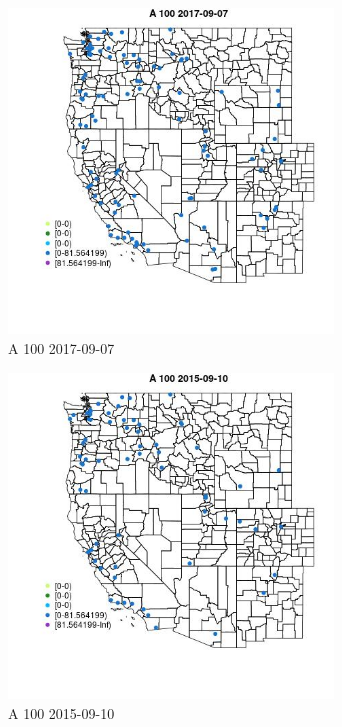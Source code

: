 \begin{figure} 
\centering  
\includegraphics[width=0.77\textwidth]{Code_Outputs/Report_ML_input_PM25_Step4_part_e_de_duplicated_aveswNAs_MapObsA_1002017-09-07.jpg} 
\caption{\label{fig:Report_ML_input_PM25_Step4_part_e_de_duplicated_aveswNAsMapObsA_1002017-09-07}A 100 2017-09-07} 
\end{figure} 
 

\begin{figure} 
\centering  
\includegraphics[width=0.77\textwidth]{Code_Outputs/Report_ML_input_PM25_Step4_part_e_de_duplicated_aveswNAs_MapObsA_1002015-09-10.jpg} 
\caption{\label{fig:Report_ML_input_PM25_Step4_part_e_de_duplicated_aveswNAsMapObsA_1002015-09-10}A 100 2015-09-10} 
\end{figure} 
 

